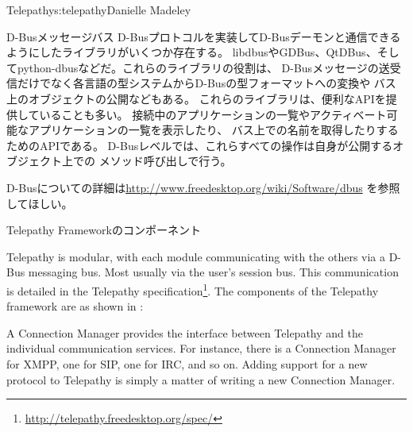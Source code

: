 \begin{aosachapter}{Telepathy}{s:telepathy}{Danielle Madeley}
\begin{aosabox}{D-Busメッセージバス}
D-Busプロトコルを実装してD-Busデーモンと通信できるようにしたライブラリがいくつか存在する。
libdbusやGDBus、QtDBus、そしてpython-dbusなどだ。これらのライブラリの役割は、
D-Busメッセージの送受信だけでなく各言語の型システムからD-Busの型フォーマットへの変換や
バス上のオブジェクトの公開などもある。
これらのライブラリは、便利なAPIを提供していることも多い。
接続中のアプリケーションの一覧やアクティベート可能なアプリケーションの一覧を表示したり、
バス上での名前を取得したりするためのAPIである。
D-Busレベルでは、これらすべての操作は自身が公開するオブジェクト上での
メソッド呼び出しで行う。

D-Busについての詳細は\url{http://www.freedesktop.org/wiki/Software/dbus}
を参照してほしい。

\end{aosabox}

\begin{aosasect1}{Telepathy Frameworkのコンポーネント}

Telepathy is modular, with each module communicating with the others
via a D-Bus messaging bus. Most usually via the user's session bus. This
communication is detailed in the Telepathy
specification\footnote{\url{http://telepathy.freedesktop.org/spec/}}.
The components of the Telepathy framework are as shown in
:

\begin{aosaitemize}

  \item A Connection Manager provides the interface between Telepathy
    and the individual communication services. For instance, there is
    a Connection Manager for XMPP, one for SIP, one for IRC, and so
    on.  Adding support for a new protocol to Telepathy is simply a
    matter of writing a new Connection Manager.


\end{aosaitemize}
\end{aosasect1}
\end{aosachapter}
